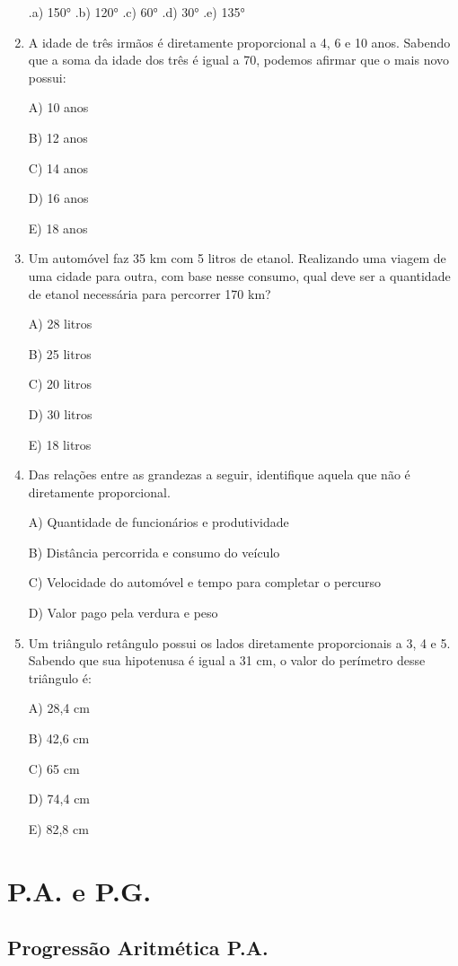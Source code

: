 \begin{multicols*}{2}
\begin{enumerate}
		.a) 150°  .b) 120°  .c) 60°  .d) 30°  .e) 135°

		\item A idade de três irmãos é diretamente proporcional a 4, 6 e 10 anos. Sabendo que a soma da idade dos três é igual a 70, podemos afirmar que o mais novo possui:

A) 10 anos

B) 12 anos

C) 14 anos

D) 16 anos

E) 18 anos

		\item Um automóvel faz 35 km com 5 litros de etanol. Realizando uma viagem de uma cidade para outra, com base nesse consumo, qual deve ser a quantidade de etanol necessária para percorrer 170 km?

A) 28 litros

B) 25 litros

C) 20 litros

D) 30 litros

E) 18 litros

		\item Das relações entre as grandezas a seguir, identifique aquela que não é diretamente proporcional.

A) Quantidade de funcionários e produtividade

B) Distância percorrida e consumo do veículo

C) Velocidade do automóvel e tempo para completar o percurso

D) Valor pago pela verdura e peso

	\item Um triângulo retângulo possui os lados diretamente proporcionais a 3, 4 e 5. Sabendo que sua hipotenusa é igual a 31 cm, o valor do perímetro desse triângulo é:

A) 28,4 cm

B) 42,6 cm

C) 65 cm

D) 74,4 cm

E) 82,8 cm
		
		\end{enumerate}
	
	\section*{P.A. e P.G.}	
	
	\subsection{Progressão Aritmética P.A.}
	

\end{multicols*}

